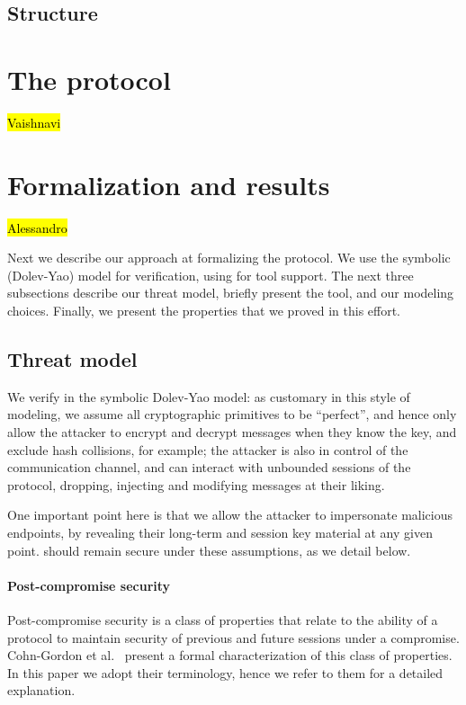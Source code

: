 \documentclass[runningheads]{llncs}
\begin{document}
\subsection{Structure}
\label{sec:structure}

\section{The \mEdhoc protocol}
\label{sec:edhoc}
\hl{Vaishnavi}


\section{Formalization and results}
\label{sec:formalization}
\hl{Alessandro}


Next we describe our approach at formalizing the \mEdhoc protocol. We use the symbolic (Dolev-Yao) model for verification, using \mTamarin for tool support. The next three subsections describe our threat model, briefly present the \mTamarin tool, and our modeling choices. Finally, we present the properties that we proved in this effort.

\subsection{Threat model}
We verify \mEdhoc in the symbolic Dolev-Yao model: as customary in this style of modeling, we assume all cryptographic primitives to be ``perfect'', and hence only allow the attacker to encrypt and decrypt messages when they know the key, and exclude hash collisions, for example; the attacker is also in control of the communication channel, and can interact with unbounded sessions of the protocol, dropping, injecting and modifying messages at their liking.

One important point here is that we allow the attacker to impersonate malicious endpoints, by revealing their long-term and session key material at any given point. \mEdhoc should remain secure under these assumptions, as we detail below.

\paragraph{Post-compromise security}
Post-compromise security is a class of properties that relate to the ability of a protocol to maintain security of previous and future sessions under a compromise.
Cohn-Gordon et al.~\cite{cohn2016post} present a formal characterization of this class of properties. In this paper we adopt their terminology, hence we refer to them for a detailed explanation.
\end{document}
